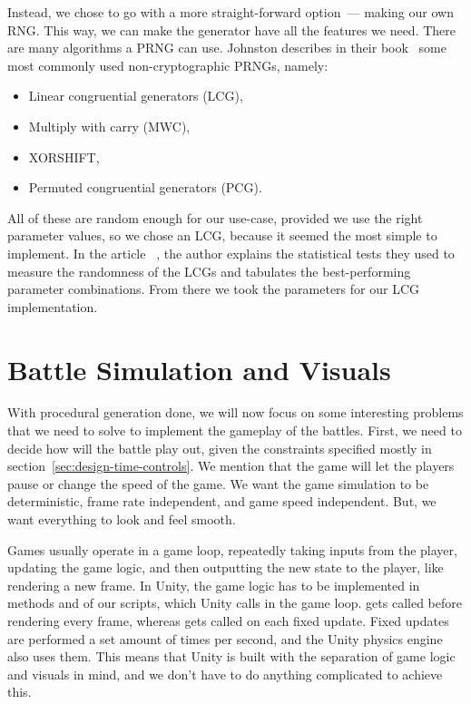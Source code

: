 Instead, we chose to go with a more straight-forward option~--- making our own RNG.
This way, we can make the generator have all the features we need.
There are many algorithms a PRNG can use.
Johnston describes in their book~\cite{johnston2018random} some most commonly used non-cryptographic PRNGs, namely:
\begin{itemize}
    \item Linear congruential generators (LCG),
    \item Multiply with carry (MWC),
    \item XORSHIFT,
    \item Permuted congruential generators (PCG).
\end{itemize}
All of these are random enough for our use-case, provided we use the right parameter values, so we chose an LCG, because it seemed the most simple to implement.
In the article ~\cite{LCGTables}, the author explains the statistical tests they used to measure the randomness of the LCGs and tabulates the best-performing parameter combinations.
From there we took the parameters for our LCG implementation.

\section{Battle Simulation and Visuals}

With procedural generation done, we will now focus on some interesting problems that we need to solve to implement the gameplay of the battles.
First, we need to decide how will the battle play out, given the constraints specified mostly in section~\ref{sec:design-time-controls}.
We mention that the game will let the players pause or change the speed of the game.
We want the game simulation to be deterministic, frame rate independent, and game speed independent.
But, we want everything to look and feel smooth.

Games usually operate in a game loop, repeatedly taking inputs from the player, updating the game logic, and then outputting the new state to the player, like rendering a new frame.
In Unity, the game logic has to be implemented in methods  and  of our  scripts, which Unity calls in the game loop.
 gets called before rendering every frame, whereas  gets called on each fixed update.
Fixed updates are performed a set amount of times per second, and the Unity physics engine also uses them.
This means that Unity is built with the separation of game logic and visuals in mind, and we don't have to do anything complicated to achieve this.

